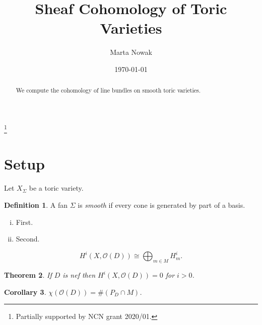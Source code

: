 \documentclass[reqno]{amsart}
\newtheorem{theorem}{Theorem}[section]
\newtheorem{corollary}[theorem]{Corollary}
\theoremstyle{definition}
\newtheorem{definition}[theorem]{Definition}
\numberwithin{equation}{section}
\begin{document}
\title[Short Title]{Sheaf Cohomology of Toric Varieties}
\author{Marta Nowak}
\address{Institute of Mathematics, Example Academy, Warsaw}
\thanks{Partially supported by NCN grant 2020/01.}
\date{\today}

\begin{abstract}
We compute the cohomology of line bundles on smooth toric varieties.
\end{abstract}
\maketitle

\section{Setup}
Let $X_\Sigma$ be a toric variety.
\begin{definition}
A fan $\Sigma$ is \emph{smooth} if every cone is generated by part of a basis.
\end{definition}

\begin{enumerate}[(i)]
\item First.
\item Second.
\end{enumerate}

\begin{equation}
H^i(X, \mathcal{O}(D)) \cong \bigoplus_{m \in M} H^i_m .
\end{equation}

\begin{theorem}\label{thm:main}
If $D$ is nef then $H^i(X, \mathcal{O}(D)) = 0$ for $i > 0$.
\end{theorem}
\begin{corollary}
$\chi(\mathcal{O}(D)) = \#(P_D \cap M)$.
\end{corollary}
\end{document}
